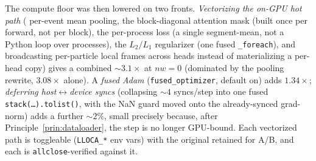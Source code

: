 \documentclass[11pt]{article}
\newcommand{\code}[1]{\texttt{#1}}
\begin{document}
The compute floor was then lowered on two fronts. \emph{Vectorizing the on-GPU hot path} (
per-event mean pooling, the block-diagonal attention mask (built once per forward, not per
block), the per-process loss (a single segment-mean, not a Python loop over processes), the
$L_2/L_1$ regularizer (one fused \code{\_foreach}), and broadcasting per-particle local frames
across heads instead of materializing a per-head copy) gives a combined $\sim3.1\times$ at
$nw{=}0$ (dominated by the pooling rewrite, $3.08\times$ alone). A \emph{fused Adam}
(\code{fused\_optimizer}, default on) adds $1.34\times$; \emph{deferring host$\leftrightarrow$device
syncs} (collapsing $\sim4$ syncs/step into one fused \code{stack(\dots).tolist()}, with the NaN
guard moved onto the already-synced grad-norm) adds a further $\sim2\%$, small precisely
because, after Principle~\ref{prin:dataloader}, the step is no longer GPU-bound. Each vectorized
path is toggleable (\code{LLOCA\_*} env vars) with the original retained for A/B, and each is
\code{allclose}-verified against it.
\end{document}
